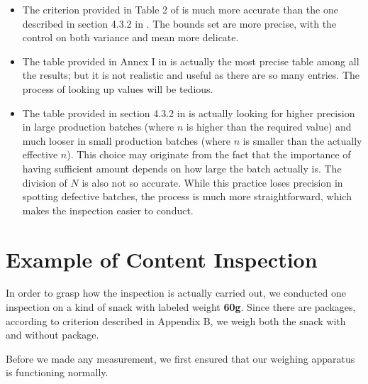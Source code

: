 \documentclass[12pt]{article}
\begin{document}
\begin{itemize}
    \item The criterion provided in Table 2 of \cite{OIML2016} is much more accurate than the one described in section 4.3.2 in \cite{JJF2005}. The bounds set are more precise, with the control on both variance and mean more delicate.
    \item The table provided in Annex I in \cite{OIML2016} is actually the most precise table among all the results; but it is not realistic and useful as there are so many entries. The process of looking up values will be tedious. 
    \item The table provided in section 4.3.2 in \cite{JJF2005} is actually looking for higher precision in large production batches (where $n$ is higher than the required value) and much looser in small production batches (where $n$ is smaller than the actually effective $n$). This choice may originate from the fact that the importance of having sufficient amount depends on how large the batch actually is. The division of $N$ is also not so accurate. While this practice loses precision in spotting defective batches, the process is much more straightforward, which makes the inspection easier to conduct. 
\end{itemize}

\section{Example of Content Inspection}

In order to grasp how the inspection is actually carried out, we conducted one inspection on a kind of snack with labeled weight \textbf{60g}. Since there are packages, according to criterion described in Appendix B, we weigh both the snack with and without package. 

Before we made any measurement, we first ensured that our weighing apparatus is functioning normally.
\newpage
\end{document}
